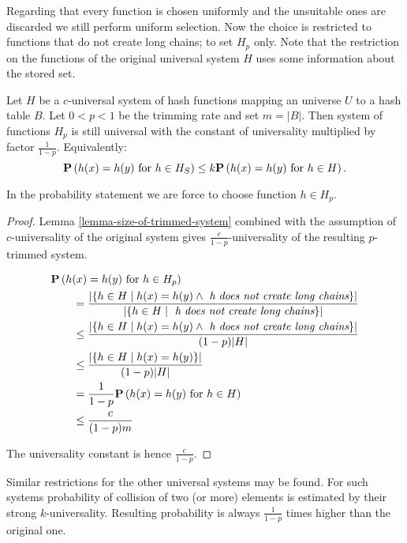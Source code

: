 Regarding that every function is chosen uniformly and the unsuitable ones are discarded we still perform uniform selection. Now the choice is restricted to functions that do not create long chains; to set $H_p$ only. Note that the restriction on the functions of the original universal system $H$ uses some information about the stored set.

\begin{theorem}
Let $H$ be a $c$-universal system of hash functions mapping an universe $U$ to a hash table $B$. Let $0 < p < 1$ be the trimming rate and set $m = |B|$. Then system of functions $H_p$ is still universal with the constant of universality multiplied by factor $\frac{1}{1 - p}$. Equivalently:
\[
	\mathbf{P}\left(h(x) = h(y) \text{ for } h \in H_S\right) \leq k \mathbf{P}\left(h(x) = h(y) \text{ for } h \in H\right) \text{.}
\]
\end{theorem}
In the probability statement we are force to choose function $h \in H_p$.
\begin{proof}
Lemma \ref{lemma-size-of-trimmed-system} combined with the assumption of $c$-universality of the original system gives $\frac{c}{1 - p}$-universality of the resulting $p$-trimmed system. 

\[
\begin{split}
& \mathbf{P}\left(h(x) = h(y) \text{ for } h \in H_p\right)  \\
	& \qquad =  \frac{|\{ h \in H \mid h(x) = h(y) \wedge \textit{ h does not create long chains} \}|}{|\lbrace h \in H \mid \textit{ h does not create long chains} \rbrace|} \\
	& \qquad \leq \frac{|\{ h \in H \mid h(x) = h(y) \wedge \textit{ h does not create long chains} \}|}{(1 - p)|H|} \\ 
	& \qquad \leq \frac{|\{ h \in H \mid h(x) = h(y) \}|}{(1 - p)|H|} \\
	& \qquad = \frac{1}{1 - p} \mathbf{P}\left(h(x) = h(y) \text{ for } h \in H\right) \\
	& \qquad \leq \frac{c}{(1 - p) m} \\
\end{split}
\]

The universality constant is hence $\frac{c}{1 - p}$.
\end{proof}

Similar restrictions for the other universal systems may be found. For such systems probability of collision of two (or more) elements is estimated by their strong $k$-universality. Resulting probability is always $\frac{1}{1 - p}$ times higher than the original one.

